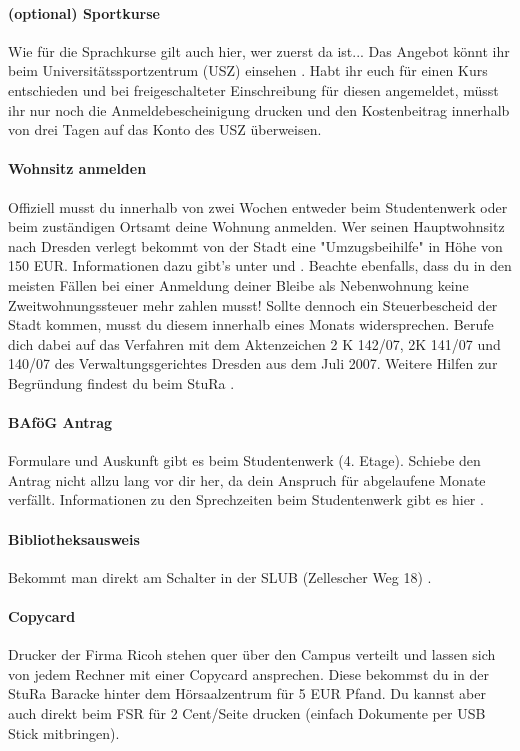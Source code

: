 \paragraph{(optional) Sportkurse}
Wie für die Sprachkurse gilt auch hier, wer zuerst da ist...
Das Angebot könnt ihr beim Universitätssportzentrum (USZ) einsehen \link.
Habt ihr euch für einen Kurs entschieden und bei freigeschalteter Einschreibung für diesen angemeldet, müsst ihr nur noch die Anmeldebescheinigung drucken und den Kostenbeitrag innerhalb von drei Tagen auf das Konto des USZ überweisen.


\paragraph{Wohnsitz anmelden}
Offiziell musst du innerhalb von zwei Wochen entweder beim Studentenwerk oder beim zuständigen Ortsamt \link deine Wohnung anmelden.
Wer seinen Hauptwohnsitz nach Dresden verlegt bekommt von der Stadt eine "Umzugsbeihilfe" in Höhe von 150 EUR.
Informationen dazu gibt's unter \link und \link.
Beachte ebenfalls, dass du in den meisten Fällen bei einer Anmeldung deiner Bleibe als Nebenwohnung keine Zweitwohnungssteuer mehr zahlen musst!
Sollte dennoch ein Steuerbescheid der Stadt kommen, musst du diesem innerhalb eines Monats widersprechen.
Berufe dich dabei auf das Verfahren mit dem Aktenzeichen 2 K 142/07, 2K 141/07 und 140/07 des Verwaltungsgerichtes Dresden aus dem Juli 2007.
Weitere Hilfen zur Begründung findest du beim StuRa \link.

\paragraph{BAföG Antrag}
Formulare und Auskunft gibt es beim Studentenwerk (4. Etage).
Schiebe den Antrag nicht allzu lang vor dir her, da dein Anspruch für abgelaufene Monate verfällt.
Informationen zu den Sprechzeiten beim Studentenwerk gibt es hier \link.

\paragraph{Bibliotheksausweis}
Bekommt man direkt am Schalter in der SLUB (Zellescher Weg 18) \link.


\paragraph{Copycard}
Drucker der Firma Ricoh stehen quer über den Campus verteilt und lassen sich von jedem Rechner mit einer Copycard ansprechen.
Diese bekommst du in der StuRa Baracke hinter dem Hörsaalzentrum für 5 EUR Pfand. Du kannst aber auch direkt beim FSR für 2 Cent/Seite drucken (einfach Dokumente per USB Stick mitbringen).

